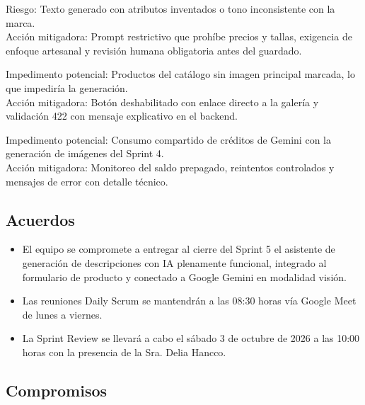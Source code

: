 \documentclass[12pt,a4paper]{article}
\begin{document}
Riesgo: Texto generado con atributos inventados o tono inconsistente con la marca.\\
Acción mitigadora: Prompt restrictivo que prohíbe precios y tallas, exigencia de enfoque artesanal y revisión humana obligatoria antes del guardado.

Impedimento potencial: Productos del catálogo sin imagen principal marcada, lo que impediría la generación.\\
Acción mitigadora: Botón deshabilitado con enlace directo a la galería y validación 422 con mensaje explicativo en el backend.

Impedimento potencial: Consumo compartido de créditos de Gemini con la generación de imágenes del Sprint 4.\\
Acción mitigadora: Monitoreo del saldo prepagado, reintentos controlados y mensajes de error con detalle técnico.

\subsection*{Acuerdos}

\begin{itemize}
    \item El equipo se compromete a entregar al cierre del Sprint 5 el asistente de generación de descripciones con IA plenamente funcional, integrado al formulario de producto y conectado a Google Gemini en modalidad visión.
    \item Las reuniones Daily Scrum se mantendrán a las 08:30 horas vía Google Meet de lunes a viernes.
    \item La Sprint Review se llevará a cabo el sábado 3 de octubre de 2026 a las 10:00 horas con la presencia de la Sra. Delia Hancco.
\end{itemize}

\subsection*{Compromisos}
\end{document}
